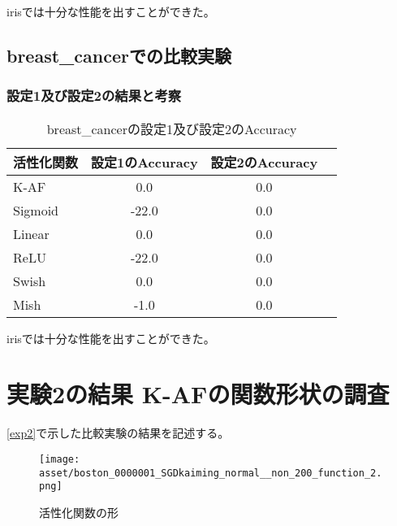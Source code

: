 irisでは十分な性能を出すことができた。



\subsection{breast\_cancerでの比較実験}
\label{ev:breastcancer}

\subsubsection{設定1及び設定2の結果と考察}


\begin{table}[htbp]
    \begin{center}
        \caption{breast\_cancerの設定1及び設定2のAccuracy}
        \vspace{2mm} 
        \begin{tabular}{l*{2}{c}r}
            活性化関数              & 設定1のAccuracy &  設定2のAccuracy \\
            \hline
            K-AF            & 0.0 & 0.0 \\
            Sigmoid            & -22.0 & 0.0\\
            Linear            & 0.0 & 0.0\\
            ReLU        & -22.0 & 0.0\\
            Swish           & 0.0 & 0.0 \\
            Mish           & -1.0 & 0.0\\
    
        \end{tabular}
    \end{center}
\end{table}



irisでは十分な性能を出すことができた。




\section{実験2の結果 K-AFの関数形状の調査}
\label{evo2}
\ref{exp2}で示した比較実験の結果を記述する。


\begin{figure}[hbtp]
    \begin{center}
        \texttt{[image: asset/boston\_0000001\_SGDkaiming\_normal\_\_non\_200\_function\_2.png]}
            \caption{活性化関数の形}
            \label{boston}
    \end{center}
\end{figure}


